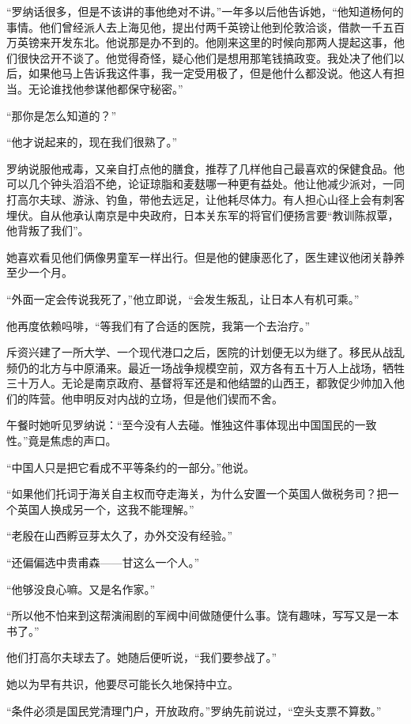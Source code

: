\par “罗纳话很多，但是不该讲的事他绝对不讲。”一年多以后他告诉她，“他知道杨何的事情。他们曾经派人去上海见他，提出付两千英镑让他到伦敦洽谈，借款一千五百万英镑来开发东北。他说那是办不到的。他刚来这里的时候向那两人提起这事，他们很快岔开不谈了。他觉得奇怪，疑心他们是想用那笔钱搞政变。我处决了他们以后，如果他马上告诉我这件事，我一定受用极了，但是他什么都没说。他这人有担当。无论谁找他参谋他都保守秘密。”
\par “那你是怎么知道的？”
\par “他才说起来的，现在我们很熟了。”
\par 罗纳说服他戒毒，又亲自打点他的膳食，推荐了几样他自己最喜欢的保健食品。他可以几个钟头滔滔不绝，论证琼脂和麦麸哪一种更有益处。他让他减少派对，一同打高尔夫球、游泳、钓鱼，带他去远足，让他耗尽体力。有人担心山径上会有刺客埋伏。自从他承认南京是中央政府，日本关东军的将官们便扬言要“教训陈叔覃，他背叛了我们”。
\par 她喜欢看见他们俩像男童军一样出行。但是他的健康恶化了，医生建议他闭关静养至少一个月。
\par “外面一定会传说我死了，”他立即说，“会发生叛乱，让日本人有机可乘。”
\par 他再度依赖吗啡，“等我们有了合适的医院，我第一个去治疗。”
\par 斥资兴建了一所大学、一个现代港口之后，医院的计划便无以为继了。移民从战乱频仍的北方与中原涌来。最近一场战争规模空前，双方各有五十万人上战场，牺牲三十万人。无论是南京政府、基督将军还是和他结盟的山西王，都敦促少帅加入他们的阵营。他申明反对内战的立场，但是他们锲而不舍。
\par 午餐时她听见罗纳说：“至今没有人去碰。惟独这件事体现出中国国民的一致性。”竟是焦虑的声口。
\par “中国人只是把它看成不平等条约的一部分。”他说。
\par “如果他们托词于海关自主权而夺走海关，为什么安置一个英国人做税务司？把一个英国人换成另一个，这我不能理解。”
\par “老殷在山西孵豆芽太久了，办外交没有经验。”
\par “还偏偏选中贵甫森——甘这么一个人。”
\par “他够没良心嘛。又是名作家。”
\par “所以他不怕来到这帮演闹剧的军阀中间做随便什么事。饶有趣味，写写又是一本书了。”
\par 他们打高尔夫球去了。她随后便听说，“我们要参战了。”
\par 她以为早有共识，他要尽可能长久地保持中立。
\par “条件必须是国民党清理门户，开放政府。”罗纳先前说过，“空头支票不算数。”
